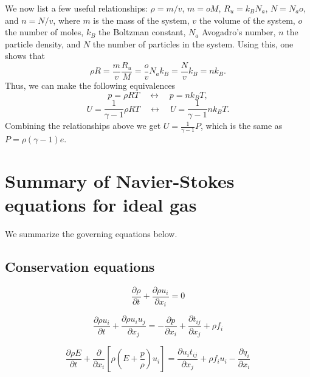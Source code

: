 \documentclass[oneside,a4paper,11pt]{report}
\begin{document}
We now list a few useful relationships: $\rho = m/v$, $m = oM$, $R_u = k_B N_a$, $N = N_a o$, and $n = N/v$, where $m$ is the mass of the system, $v$ the volume of the system, $o$ the number of moles, $k_B$ the Boltzman constant, $N_a$ Avogadro's number, $n$ the particle density, and $N$ the number of particles in the system. Using this, one shows that
\begin{equation}
    \rho R = \frac{m}{v} \frac{R_u}{M} = \frac{o}{v} N_a k_B = \frac{N}{v} k_B = n k_B.
\end{equation}
Thus, we can make the following equivalences
\begin{equation}
    p = \rho R T \quad \longleftrightarrow \quad p = nk_B T,
\end{equation}
\begin{equation}
    U = \frac{1}{\gamma - 1} \rho R T \quad \longleftrightarrow \quad U = \frac{1}{\gamma - 1} n k_B T.
\end{equation}
Combining the relationships above we get $U = \frac{1}{\gamma - 1} P$, which is the same as $P = \rho (\gamma -1) e$.


\section{Summary of Navier-Stokes equations for ideal gas}
We summarize the governing equations below.

\subsection{Conservation equations}
\begin{equation}
    \frac{\partial \rho}{\partial t} + \frac{\partial \rho u_i}{\partial x_i} = 0
\end{equation}

\begin{equation}
\frac{\partial \rho u_i}{\partial t} + \frac{\partial \rho u_i u_j}{\partial x_j} = - \frac{\partial p}{\partial x_i} + \frac{\partial t_{ij}}{\partial x_j} + \rho f_i
\end{equation}

\begin{equation}
\frac{\partial \rho E}{\partial t} + \frac{\partial}{\partial x_i} \left [ \rho \left ( E + \frac{p}{\rho} \right ) u_i \right ] = \frac{\partial u_i t_{ij}}{\partial x_j} + \rho f_i u_i -  \frac{\partial q_i}{\partial x_i}
\end{equation}
\end{document}
